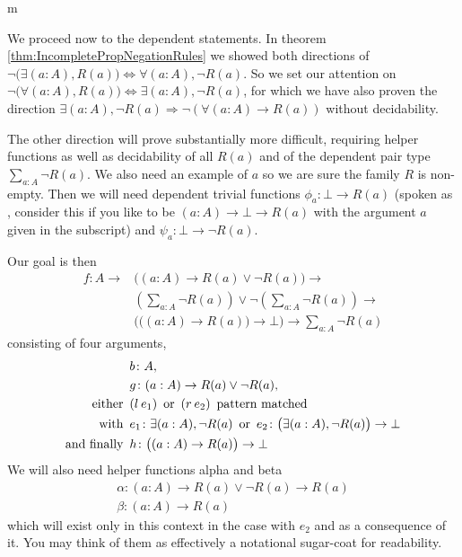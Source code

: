 \documentclass[11pt]{article}
\begin{document}
\begin{my proof}{m}
\begin{itemize}
\end{itemize}

We proceed now to the dependent statements. In theorem \ref{thm:IncompletePropNegationRules} we showed both directions of $\neg \big(\exists (a : A), R(a)\big) \Leftrightarrow \forall (a : A), \neg R(a)$. So we set our attention on $\neg \big(\forall (a : A), R(a) \big) \Leftrightarrow \exists (a : A), \neg R(a)$, for which we have also proven the direction $\exists (a : A), \neg R(a) \Rightarrow \neg (\forall (a : A) \to R(a))$ without decidability.

The other direction will prove substantially more difficult, requiring helper functions as well as decidability of all $R(a)$ and of the dependent pair type $\sum_{a : A} \neg R (a)$. We also need an example of $a$ so we are sure the family $R$ is non-empty. Then we will need dependent trivial functions $\phi_a \colon \bot \to R(a)$ (spoken as , consider this if you like to be $(a : A) \to \bot \to R(a)$ with the argument $a$ given in the subscript) and $\psi_a \colon \bot \to \neg R(a)$.

Our goal is then \begin{align*}
f \colon A \to & \big((a : A) \to R(a) \vee \neg R(a) \big) \to \\
& \left( \sum_{a:A} \neg R(a) \right) \vee \neg \left( \sum_{a:A} \neg R(a) \right) \to \\
& \Big( \big((a : A) \to R(a) \big) \to \bot \Big) \to \sum_{a : A} \neg R(a)
\end{align*}
consisting of four arguments, \begin{align*}
& b \colon A, \\
& g \colon (a : A) \to R(a) \vee \neg R(a), \\
\text{either}\hspace{0.5em} & (l \hspace{0.2em} e_1) \hspace{0.5em} \text{or} \hspace{0.5em} (r \hspace{0.2em} e_2) \hspace{0.5em} \text{pattern matched}\\
\text{with}\hspace{0.5em} & e_1 \colon \exists (a : A), \neg R(a) \hspace{0.5em} \text{or} \hspace{0.5em} e_2 \colon \big( \exists (a : A), \neg R(a) \big) \to \bot \\
\text{and finally} \hspace{0.5em}& h \colon \big((a : A) \to R(a) \big) \to \bot
\end{align*}
We will also need helper functions alpha and beta
\begin{gather*}
\alpha \colon (a : A) \to R(a) \vee \neg R(a) \to R(a) \\
\beta \colon (a : A) \to R(a)
\end{gather*}
which will exist only in this context in the case with $e_2$ and as a consequence of it. You may think of them as effectively a notational sugar-coat for readability.


\end{my proof}
\end{document}
